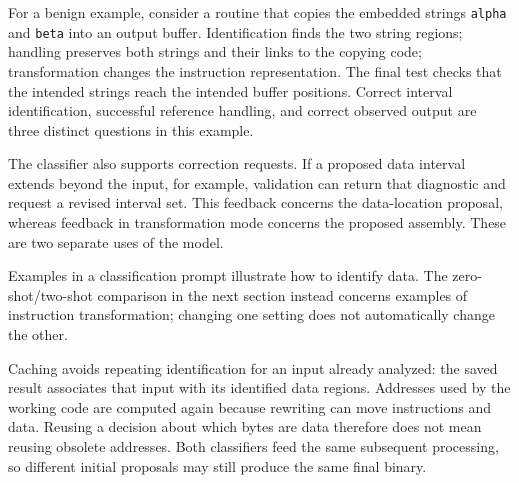 For a benign example, consider a routine that copies the embedded strings
\texttt{alpha} and \texttt{beta} into an output buffer. Identification finds
the two string regions; handling preserves both strings and their links
to the copying code; transformation changes the instruction representation.
The final test checks that the intended strings reach the intended buffer
positions. Correct interval identification, successful reference handling,
and correct observed output are three distinct questions in this example.

The classifier also supports correction requests. If a proposed data
interval extends beyond the input, for example, validation can return that
diagnostic and request a revised interval set. This feedback concerns the
data-location proposal, whereas feedback in transformation mode concerns
the proposed assembly. These are two separate uses of the model.

Examples in a classification prompt illustrate how to identify data.
The zero-shot/two-shot comparison in the next section instead concerns
examples of instruction transformation; changing one setting does not
automatically change the other.

Caching avoids repeating identification for an input already analyzed:
the saved result associates that input with its identified data regions.
Addresses used by the working code are computed again because rewriting
can move instructions and data. Reusing a decision about which bytes are
data therefore does not mean reusing obsolete addresses. Both classifiers
feed the same subsequent processing, so different initial proposals may
still produce the same final binary.
